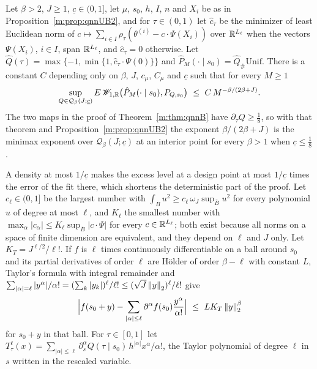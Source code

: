 \begin{proposition}\label{m:prop:qnnUB3}
Let $\beta>2$, $J\ge1$, $\underline c\in(0,1]$, let $\mu$, $s_0$, $h$, $I$, $n$ and $X_i$ be as in Proposition~\ref{m:prop:qnnUB2}, and for $\tau\in(0,1)$ let $\hat c_\tau$ be the minimizer of least Euclidean norm of $c\mapsto\sum_{i\in I}\rho_\tau(\theta^{(i)}-c\cdot\Psi(X_i))$ over $\mathbb{R}^{L_\ell}$ when the vectors $\Psi(X_i)$, $i\in I$, span $\mathbb{R}^{L_\ell}$, and $\hat c_\tau=0$ otherwise. Let $\hat Q(\tau)=\max\{-1,\min\{1,\hat c_\tau\cdot\Psi(0)\}\}$ and $\hat P_M(\cdot\mid s_0)=\hat Q_\#\mathrm{Unif}$. There is a constant $C$ depending only on $\beta$, $J$, $c_\mu$, $C_\mu$ and $\underline c$ such that for every $M\ge1$
\[
\sup_{Q\in\mathcal Q_\beta(J;\underline c)}E\,\Wone_{1,\R}\big(\hat P_M(\cdot\mid s_0),P_{Q,s_0}\big)\ \le\ C\,M^{-\beta/(2\beta+J)} .
\]
The two maps in the proof of Theorem~\ref{m:thm:qnnB} have $\partial_\tau Q\ge\frac18$, so with that theorem and Proposition~\ref{m:prop:qnnUB2} the exponent $\beta/(2\beta+J)$ is the minimax exponent over $\mathcal Q_\beta(J;\underline c)$ at an interior point for every $\beta>1$ when $\underline c\le\frac18$.
\end{proposition}

A density at most $1/\underline c$ makes the excess level at a design point at most $1/\underline c$ times the error of the fit there, which shortens the deterministic part of the proof. Let $c_\ell\in(0,1]$ be the largest number with $\int_{\bar B}u^2\ge c_\ell\,\omega_J\sup_{\bar B}u^2$ for every polynomial $u$ of degree at most $\ell$, and $K_\ell$ the smallest number with $\max_\alpha|c_\alpha|\le K_\ell\sup_{\bar B}|c\cdot\Psi|$ for every $c\in\mathbb{R}^{L_\ell}$; both exist because all norms on a space of finite dimension are equivalent, and they depend on $\ell$ and $J$ only. Let $K_T=J^{\ell/2}/\ell!$. If $f$ is $\ell$ times continuously differentiable on a ball around $s_0$ and its partial derivatives of order $\ell$ are H\"older of order $\beta-\ell$ with constant $L$, Taylor's formula with integral remainder and $\sum_{|\alpha|=\ell}|y^\alpha|/\alpha!=(\sum_k|y_k|)^\ell/\ell!\le(\sqrt J\left\|y\right\|_2)^\ell/\ell!$ give
\begin{equation}\label{m:eq:taylorbeta}
\Big|f(s_0+y)-\sum_{|\alpha|\le\ell}\partial^\alpha f(s_0)\frac{y^\alpha}{\alpha!}\Big|\ \le\ LK_T\left\|y\right\|_2^\beta
\end{equation}
for $s_0+y$ in that ball. For $\tau\in[0,1]$ let $T^\ell_\tau(x)=\sum_{|\alpha|\le\ell}\partial_s^\alpha Q(\tau\mid s_0)\,h^{|\alpha|}x^\alpha/\alpha!$, the Taylor polynomial of degree $\ell$ in $s$ written in the rescaled variable.

